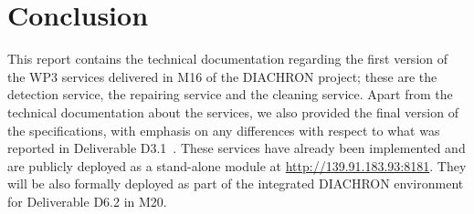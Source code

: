 \section{Conclusion}
\label{sec:conclusion}

This report contains the technical documentation regarding the first version of the WP3 services delivered in M16 of the DIACHRON project; these are the detection service, the repairing service and the cleaning service.
Apart from the technical documentation about the services, we also provided the final version of the specifications, with emphasis on any differences with respect to what was reported in Deliverable D3.1~\cite{d3.1}.
These services have already been implemented and are publicly deployed as a stand-alone module at 
\url{http://139.91.183.93:8181}. They will be also formally deployed as part of the integrated DIACHRON environment for Deliverable D6.2 in M20.
